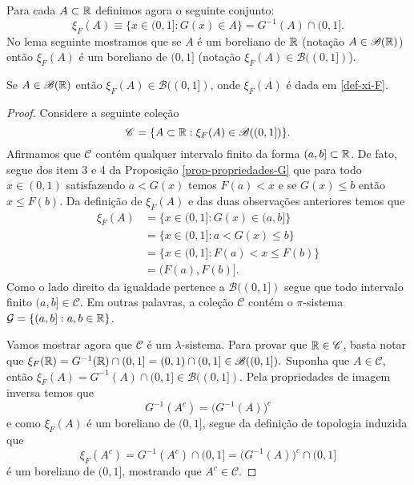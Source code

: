 \bigskip

Para cada $A\subset \mathbb{R}$ definimos agora o seguinte conjunto:
	\begin{equation}\label{def-xi-F}
		\xi_F(A) \equiv \{ x\in (0,1]: G(x)\in A \} = G^{-1}(A)\cap (0,1].
	\end{equation}
No lema seguinte mostramos que se $A$ 
é um boreliano de $\mathbb{R}$ (notação $A\in\mathscr{B}(\mathbb{R})$)  
então 
$\xi_F(A)$ é um boreliano de $(0,1]$ 
(notação $\xi_F(A) \in\mathscr{B}((0,1])$).

\begin{lema}
	Se $A\in\mathscr{B}(\mathbb{R})$ então $\xi_F(A) \in\mathscr{B}((0,1])$, onde
	$\xi_F(A)$ é dada em \eqref{def-xi-F}.
\end{lema}



\begin{proof}
Considere a seguinte coleção 
	\[
		\mathscr{C} 
		=
		\{ A\subset\mathbb{R}: \xi_F(A) \in \mathscr{B}((0,1])\}.
	\]
Afirmamos que $\mathscr{C}$ contém qualquer intervalo finito da forma
$(a,b]\subset \mathbb{R}$. De fato, segue dos item 3 e 4 
da Proposição \ref{prop-propriedades-G} que 
para todo $x\in (0,1)$ satisfazendo 
$a<G(x)$ temos $F(a)<x$ e se $G(x)\leq b$ então 
$x\leq F(b)$. Da definição de $\xi_{F}(A)$ e 
das duas observações anteriores temos que
%
%
\begin{align*}
	\xi_F(A) 
	&= 
	\{ x\in (0,1]: G(x) \in (a,b] \}
	\\
	&=	
	\{ x\in (0,1]: a<G(x)\leq b  \}
	\\
	&=
	\{ x\in (0,1]:F(a) <x \leq F(b) \}
	\\
	&=
	(F(a),F(b)].
\end{align*}
Como o lado direito da igualdade pertence a $\mathscr{B}((0,1])$
segue que todo intervalo finito $(a,b]\in \mathscr{C}$.
Em outras palavras, a coleção $\mathscr{C}$ 
contém o $\pi$-sistema $\mathcal{G}=\{ (a,b]: a,b\in\mathbb{R}\}$.


Vamos mostrar agora que $\mathscr{C}$ é um $\lambda$-sistema. 
Para provar que $\mathbb{R}\in \mathscr{C}$, basta 
notar que
$
	\xi_F(\mathbb{R})
	= G^{-1}(\mathbb{R})\cap (0,1] 
	= (0,1)\cap (0,1]
	\in \mathscr{B}((0,1]). 
$
Suponha que $A\in\mathscr{C}$, então 
$\xi_F(A)=G^{-1}(A)\cap (0,1]\in \mathscr{B}((0,1])$.
Pela propriedades de imagem inversa temos que 
\[
	G^{-1}(A^c)= \Big(G^{-1}(A)\Big)^c
\]
e como $\xi_F(A)$ é um boreliano de $(0,1]$, segue da definição 
de topologia induzida que 
	\[
		\xi_F(A^c)
		=
		G^{-1}(A^c)\cap (0,1]
		= 
		\Big(G^{-1}(A)\Big)^c\cap (0,1]		
	\]
é um boreliano de $(0,1]$, mostrando que $A^c\in\mathscr{C}$.


\end{proof}
